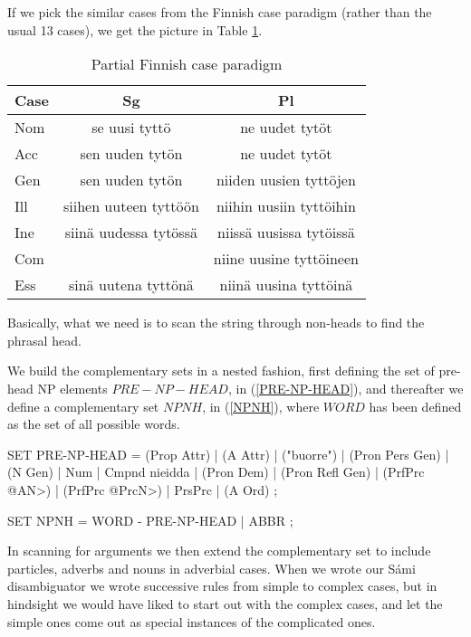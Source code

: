 \documentclass[a4paper,english]{article} %
\begin{document}
If we pick the similar cases from the Finnish case paradigm (rather than the usual 13 cases), we get the picture in Table \ref{fincas}.%

\begin{table}[htdp]
\caption{Partial Finnish case paradigm}
\begin{center}
\begin{tabular}{|l|c|c|}
\hline
Case  & Sg       & Pl                        \\ \hline
Nom    & se    uusi tyttö       & ne uudet tytöt      \\ \hline
Acc    & sen    uuden tytön     & ne uudet tytöt     \\ \hline
Gen    & sen    uuden tytön     & niiden uusien tyttöjen     \\ \hline
Ill    & siihen uuteen tyttöön  & niihin uusiin tyttöihin   \\ \hline
Ine    & siinä uudessa tytössä  & niissä uusissa tytöissä      \\ \hline
Com    &                        & niine  uusine tyttöineen     \\ \hline
Ess    & sinä uutena tyttönä    & niinä uusina tyttöinä      \\ \hline
\end{tabular}
\end{center}
\label{fincas}
\end{table}%


Basically, what we need is to scan the string through non-heads to find the phrasal head.%

We build the complementary sets in a nested fashion, first defining the set of pre-head NP elements $PRE-NP-HEAD$, in (\ref{PRE-NP-HEAD}), and thereafter we define a complementary set $NPNH$, in (\ref{NPNH}), where $WORD$ has been defined as the set of all possible words.%

\begin{example}\label{PRE-NP-HEAD}
SET PRE-NP-HEAD = (Prop Attr) | (A Attr) | ("buorre") | (Pron Pers Gen) | (N Gen) | Num | Cmpnd nieidda | (Pron Dem) | (Pron Refl Gen) | (PrfPrc @AN>) | (PrfPrc @PrcN>) | PrsPrc | (A Ord) ; \\
\end{example}
\begin{example}\label{NPNH}
SET NPNH = WORD - PRE-NP-HEAD | ABBR ; \\                 
\end{example}

In scanning for arguments we then extend the complementary set to include particles, adverbs and nouns in adverbial cases. When we wrote our Sámi disambiguator we wrote successive rules from simple to complex cases, but in hindsight we would have liked to start out with the complex cases, and let the simple ones come out as special instances of the complicated ones.%
\end{document}
